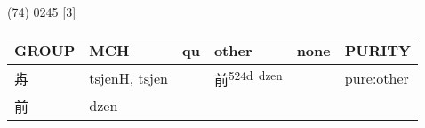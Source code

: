 \documentclass[14pt,a4paper]{scrartcl}
\begin{document}
(74) 0245 {[}3{]}

\begin{longtable}[c]{@{}llllll@{}}
\toprule
\begin{minipage}[b]{0.14\columnwidth}\raggedright\strut
GROUP
\strut\end{minipage} &
\begin{minipage}[b]{0.14\columnwidth}\raggedright\strut
MCH
\strut\end{minipage} &
\begin{minipage}[b]{0.14\columnwidth}\raggedright\strut
qu
\strut\end{minipage} &
\begin{minipage}[b]{0.14\columnwidth}\raggedright\strut
other
\strut\end{minipage} &
\begin{minipage}[b]{0.14\columnwidth}\raggedright\strut
none
\strut\end{minipage} &
\begin{minipage}[b]{0.14\columnwidth}\raggedright\strut
PURITY
\strut\end{minipage}\tabularnewline
\midrule
\endhead
\begin{minipage}[t]{0.14\columnwidth}\raggedright\strut
歬
\strut\end{minipage} &
\begin{minipage}[t]{0.14\columnwidth}\raggedright\strut
tsjenH, tsjen
\strut\end{minipage} &
\begin{minipage}[t]{0.14\columnwidth}\raggedright\strut
\strut\end{minipage} &
\begin{minipage}[t]{0.14\columnwidth}\raggedright\strut
前\textsuperscript{524d~dzen}
\strut\end{minipage} &
\begin{minipage}[t]{0.14\columnwidth}\raggedright\strut
\strut\end{minipage} &
\begin{minipage}[t]{0.14\columnwidth}\raggedright\strut
pure:other
\strut\end{minipage}\tabularnewline
\begin{minipage}[t]{0.14\columnwidth}\raggedright\strut
前
\strut\end{minipage} &
\begin{minipage}[t]{0.14\columnwidth}\raggedright\strut
dzen
\strut\end{minipage} &
\begin{minipage}[t]{0.14\columnwidth}\raggedright\strut

\end{minipage}
\end{longtable}
\end{document}
